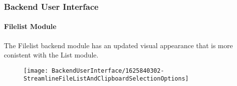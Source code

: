 %

\begin{frame}[fragile]
	\frametitle{Backend User Interface}
	\framesubtitle{Filelist Module}

	The Filelist backend module has an updated visual appearance that is more
	conistent with the List module.

	\begin{figure}
		\texttt{[image: BackendUserInterface/1625840302-StreamlineFileListAndClipboardSelectionOptions]}
	\end{figure}

\end{frame}

